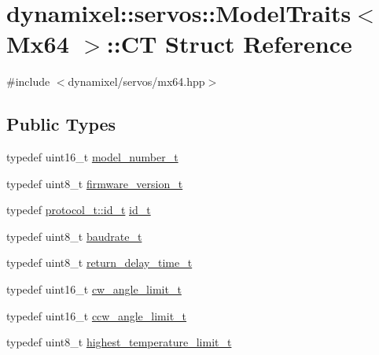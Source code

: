 \hypertarget{structdynamixel_1_1servos_1_1_model_traits_3_01_mx64_01_4_1_1_c_t}{}\section{dynamixel\+:\+:servos\+:\+:Model\+Traits$<$ Mx64 $>$\+:\+:CT Struct Reference}
\label{structdynamixel_1_1servos_1_1_model_traits_3_01_mx64_01_4_1_1_c_t}


{\ttfamily \#include $<$dynamixel/servos/mx64.\+hpp$>$}

\subsection*{Public Types}
\begin{DoxyCompactItemize}
\item 
typedef uint16\+\_\+t \hyperlink{structdynamixel_1_1servos_1_1_model_traits_3_01_mx64_01_4_1_1_c_t_a3fd21474b292dda4b09bc9269bffadee}{model\+\_\+number\+\_\+t}
\item 
typedef uint8\+\_\+t \hyperlink{structdynamixel_1_1servos_1_1_model_traits_3_01_mx64_01_4_1_1_c_t_aed4ec64dd0f27c3e32eea08d6d1decd5}{firmware\+\_\+version\+\_\+t}
\item 
typedef \hyperlink{classdynamixel_1_1protocols_1_1_protocol1_a1d4dfa22b01f80b1876d14f539d52b5c}{protocol\+\_\+t\+::id\+\_\+t} \hyperlink{structdynamixel_1_1servos_1_1_model_traits_3_01_mx64_01_4_1_1_c_t_a3d963c11cb823e4dc024e7c18bb80e23}{id\+\_\+t}
\item 
typedef uint8\+\_\+t \hyperlink{structdynamixel_1_1servos_1_1_model_traits_3_01_mx64_01_4_1_1_c_t_ab3888d542c00250138ef5a328d77a978}{baudrate\+\_\+t}
\item 
typedef uint8\+\_\+t \hyperlink{structdynamixel_1_1servos_1_1_model_traits_3_01_mx64_01_4_1_1_c_t_ad342eadcece3ecf4f47d345b80f2b88c}{return\+\_\+delay\+\_\+time\+\_\+t}
\item 
typedef uint16\+\_\+t \hyperlink{structdynamixel_1_1servos_1_1_model_traits_3_01_mx64_01_4_1_1_c_t_a2f3de52f0d1e474494254fa8654ef9f2}{cw\+\_\+angle\+\_\+limit\+\_\+t}
\item 
typedef uint16\+\_\+t \hyperlink{structdynamixel_1_1servos_1_1_model_traits_3_01_mx64_01_4_1_1_c_t_adc386da9764cc01eefa9a2f0c7d7551e}{ccw\+\_\+angle\+\_\+limit\+\_\+t}
\item 
typedef uint8\+\_\+t \hyperlink{structdynamixel_1_1servos_1_1_model_traits_3_01_mx64_01_4_1_1_c_t_a48246cdb32980742a52e2e5f6dec65f2}{highest\+\_\+temperature\+\_\+limit\+\_\+t}

\end{DoxyCompactItemize}
